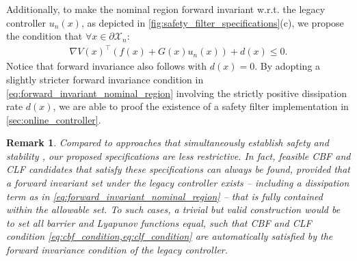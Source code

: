 \documentclass[lettersize,journal]{IEEEtran}
\newtheorem{remark}{Remark}
\newcommand{\afterReviewChangedBox}[1]{{\color{orange}#1}}
\begin{document}
Additionally, to make the nominal region forward invariant w.r.t. the legacy controller $u_n(x)$, as depicted in \cref{fig:safety_filter_specifications}(c), we propose the condition that $\forall x \in \partial \mathcal X_n$:
\begin{align} \label{eq:forward_invariant_nominal_region}
   \nabla V(x)^\top \left ( f(x) + G(x) u_n(x) \right ) + d(x) \leq 0.
\end{align}
Notice that forward invariance also follows with $d(x) = 0$.
By adopting a slightly stricter forward invariance condition in \cref{eq:forward_invariant_nominal_region} involving the strictly positive dissipation rate $d(x)$, we are able to proof the existence of a safety filter implementation in \cref{sec:online_controller}.
\begin{remark}
   \textit{\afterReviewChangedBox{
      Compared to approaches that simultaneously establish safety and stability \cite{RomdlonyJayawardhana:14}, our proposed specifications are less restrictive.
      In fact, feasible CBF and CLF candidates that satisfy these specifications can always be found, provided that a forward invariant set under the legacy controller exists -- including a dissipation term as in \cref{eq:forward_invariant_nominal_region} -- that is fully contained within the allowable set.
      To such cases, a trivial but valid construction would be to set all barrier and Lyapunov functions equal, such that CBF and CLF condition \cref{eq:cbf_condition,eq:clf_condition} are automatically satisfied by the forward invariance condition of the legacy controller.
   }}
\end{remark}
\end{document}
